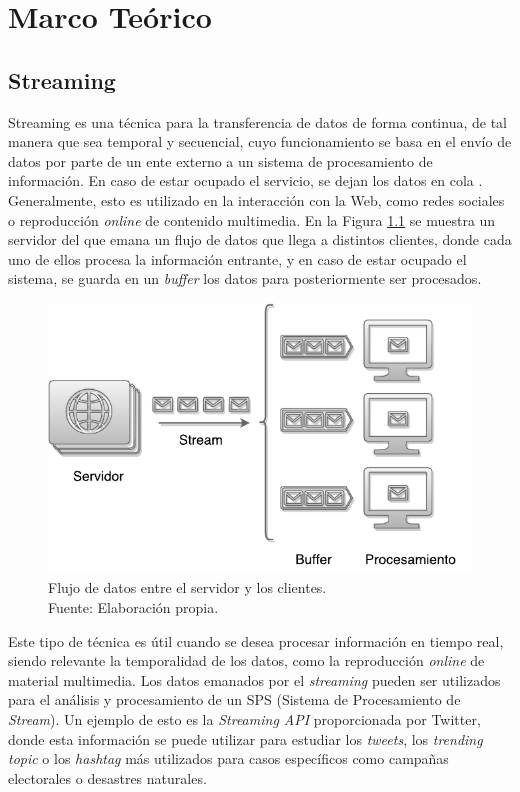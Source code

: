 \chapter{Marco Te\'orico}
\label{cap:marcoTeorico}

\section{Streaming}
\label{sec:streaming}

Streaming es una t\'ecnica para la transferencia de datos de forma continua, de tal manera que sea temporal y secuencial, cuyo funcionamiento se basa en el env\'io de datos por parte de un ente externo a un sistema de procesamiento de informaci\'on. \normalsize{En caso} de estar ocupado el servicio, se dejan los datos en cola \citep{Menin2002SMH}. Generalmente, esto es utilizado en la interacci\'on con la Web, como redes sociales o reproducci\'on \textit{online} de contenido multimedia. En la Figura \ref{fig:streaming} se muestra un servidor \normalsize{del} que emana un flujo de datos que llega a distintos clientes, donde cada uno de ellos procesa la informaci\'on entrante, y en caso de estar ocupado el sistema, se guarda en un \textit{buffer} los datos para posteriormente ser procesados.

\begin{figure}[ht!]
  \centering
    \includegraphics[scale=0.7]{images/Streaming.pdf}
  \caption[Flujo de datos entre el servidor y los clientes.]{Flujo de datos entre el servidor y los clientes. \\Fuente: Elaboraci\'on propia.}
  \label{fig:streaming}
\end{figure}

Este tipo de t\'ecnica es \'util cuando se desea procesar informaci\'on en tiempo real, siendo relevante la temporalidad de los datos, como la reproducci\'on \textit{online} de material multimedia. Los datos emanados por el \textit{streaming} pueden ser utilizados para el an\'alisis y procesamiento de un SPS (Sistema de Procesamiento de \textit{Stream}). Un ejemplo de esto es la \textit{Streaming API} proporcionada por Twitter, donde esta informaci\'on se puede utilizar para estudiar los \textit{tweets}, los \textit{trending topic} o los \textit{hashtag} m\'as utilizados para casos espec\'ificos como campa\~nas electorales o desastres naturales.

